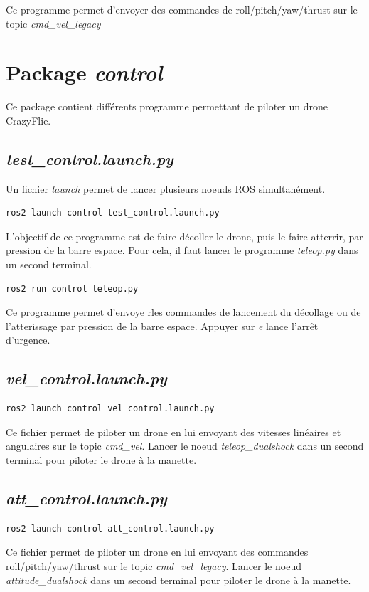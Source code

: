 Ce programme permet d'envoyer des commandes de roll/pitch/yaw/thrust sur le topic \textit{cmd\_vel\_legacy}

\section{Package \textit{control}}


Ce package contient différents programme permettant de piloter un drone CrazyFlie.

\subsection{\textit{test\_control.launch.py}}

Un fichier \textit{launch} permet de lancer plusieurs noeuds ROS simultanément.

\begin{lstlisting}[style=commandstyle]
ros2 launch control test_control.launch.py
\end{lstlisting}

L'objectif de ce programme est de faire décoller le drone, puis le faire atterrir, par pression de la barre espace. Pour cela, il faut lancer le programme \textit{teleop.py} dans un second terminal. 

\begin{lstlisting}[style=commandstyle]
ros2 run control teleop.py
\end{lstlisting}

Ce programme permet d'envoye rles commandes de lancement du décollage ou de l'atterissage par pression de la barre espace. Appuyer sur \textit{e} lance l'arrêt d'urgence.

\subsection{\textit{vel\_control.launch.py}}

\begin{lstlisting}[style=commandstyle]
ros2 launch control vel_control.launch.py
\end{lstlisting}

Ce fichier permet de piloter un drone en lui envoyant des vitesses linéaires et angulaires sur le topic \textit{cmd\_vel}. Lancer le noeud \textit{teleop\_dualshock} dans un second terminal pour piloter le drone à la manette.

\subsection{\textit{att\_control.launch.py}}

\begin{lstlisting}[style=commandstyle]
ros2 launch control att_control.launch.py
\end{lstlisting}

Ce fichier permet de piloter un drone en lui envoyant des commandes roll/pitch/yaw/thrust sur le topic \textit{cmd\_vel\_legacy}. Lancer le noeud \textit{attitude\_dualshock} dans un second terminal pour piloter le drone à la manette.

